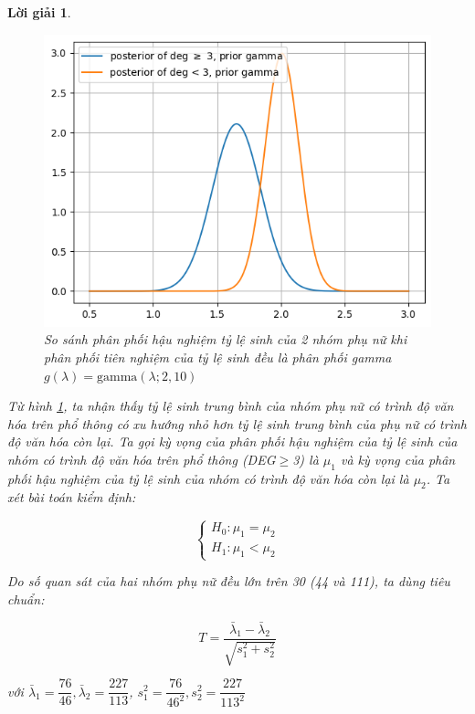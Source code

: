 \documentclass[14pt, a4paper]{article}
\theoremstyle{sltheorem}
\theoremstyle{soltheorem}
\newtheorem*{loigiai}{Lời giải}
\begin{document}
\begin{loigiai}
\begin{enumerate}
\begin{itemize}
        \begin{figure}[h!]
            \centering
            \includegraphics[width=0.6\linewidth]{figures/posterior_prior_gamma.png}
            \caption{So sánh phân phối hậu nghiệm tỷ lệ sinh của 2 nhóm phụ nữ khi phân phối tiên nghiệm của tỷ lệ sinh đều là phân phối gamma $g(\lambda)=\text{gamma}(\lambda; 2, 10)$}
            \label{fig:posterior_prior_gamma}
        \end{figure}
        

        Từ hình \ref{fig:posterior_prior_gamma}, ta nhận thấy tỷ lệ sinh trung bình của nhóm phụ nữ có trình độ văn hóa trên phổ thông có xu hướng nhỏ hơn tỷ lệ sinh trung bình của phụ nữ có trình độ văn hóa còn lại.
        Ta gọi kỳ vọng của phân phối hậu nghiệm của tỷ lệ sinh của nhóm có trình độ văn hóa trên phổ thông (DEG$\geq$3) là $\mu_1$ và kỳ vọng của phân phối hậu nghiệm của tỷ lệ sinh của nhóm có trình độ văn hóa còn lại là $\mu_2$.
        Ta xét bài toán kiểm định:
    
        \begin{equation*}
            \begin{cases}
                H_0: \mu_1 = \mu_2 \\
                H_1: \mu_1 < \mu_2
            \end{cases}
        \end{equation*}
    
        Do số quan sát của hai nhóm phụ nữ đều lớn trên 30 (44 và 111), ta dùng tiêu chuẩn:
    
        \begin{equation*}
            T = \dfrac{\bar{\lambda}_1 - \bar{\lambda}_2}{\sqrt{s_1^2 + s_2^2}}
        \end{equation*}
    
        với $\bar{\lambda}_1=\dfrac{76}{46}, \bar{\lambda}_2=\dfrac{227}{113}$, $s_1^2=\dfrac{76}{46^2}, s_2^2=\dfrac{227}{113^2}$
    

\end{itemize}
\end{enumerate}
\end{loigiai}
\end{document}
